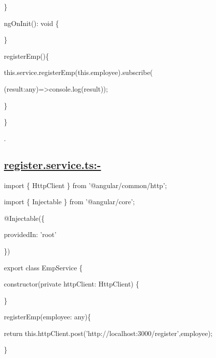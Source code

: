 \documentclass[11pt,twoside]{article}
\begin{document}
    \hspace*{5}\}

\vspace{1\baselineskip}
\hspace*{5}ngOnInit(): void \{

\vspace{1\baselineskip}
\hspace*{5}\}

\vspace{1\baselineskip}
\hspace*{5}registerEmp()\{

  \hspace*{10}this.service.registerEmp(this.employee).subscribe( 
  
    \hspace*{15}(result:any)=>console.log(result));

  \hspace*{5}\}

\}

\vspace{1\baselineskip}
.

\subsection*{\uline{register.service.ts:-}}

import \{ HttpClient \} from '@angular/common/http'; 

import \{ Injectable \} from '@angular/core';

\vspace{1\baselineskip}
@Injectable(\{ 

  \hspace*{5}providedIn: 'root'

\})

export class EmpService \{

  \vspace{1\baselineskip}
  \hspace*{5}constructor(private httpClient: HttpClient) \{

  \hspace*{5}\}

\vspace{1\baselineskip}
\hspace*{5}registerEmp(employee: any)\{

  \hspace*{10}return this.httpClient.post('http://localhost:3000/register',employee);

  \hspace*{5}\} 
\end{document}
